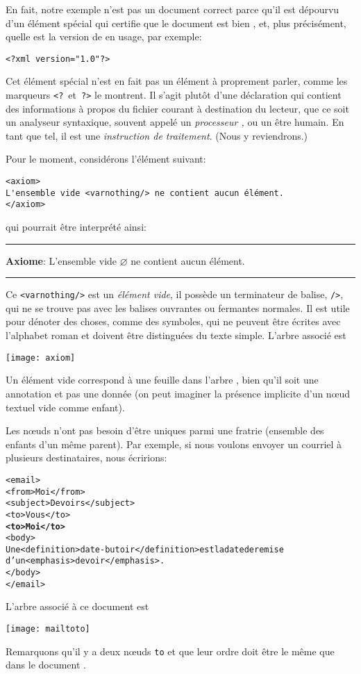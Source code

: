 En fait, notre exemple n'est pas un document \XML correct parce qu'il
est dépourvu d'un élément spécial qui certifie que le document est
bien \XML, et, plus précisément, quelle est la version de \XML en
usage, par exemple:
\begin{verbatim}
<?xml version="1.0"?>
\end{verbatim}
Cet élément spécial n'est en fait pas un élément à proprement parler,
comme les marqueurs \texttt{<?}~et~\texttt{?>} le montrent. Il s'agit
plutôt d'une déclaration qui contient des informations à propos du
fichier courant à destination du lecteur, que ce soit un analyseur
syntaxique, souvent appelé un \emph{processeur \XML,} ou un être
humain. En tant que tel, il est une \emph{instruction de traitement}.
(Nous y reviendrons.)

Pour le moment, considérons l'élément suivant:
\begin{verbatim}
<axiom>
L'ensemble vide <varnothing/> ne contient aucun élément.
</axiom>
\end{verbatim}
qui pourrait être interprété ainsi:\\
\noindent\rule{\linewidth}{0.5pt}
\textsf{
\textbf{Axiome}: L'ensemble vide \(\varnothing\) ne contient aucun élément.}\\
\noindent\rule{\linewidth}{0.5pt}

Ce \verb|<varnothing/>| est un \emph{élément vide}, il possède un
terminateur de balise, \verb|/>|, qui ne se trouve pas avec les
balises ouvrantes ou fermantes normales. Il est utile pour dénoter des
choses, comme des symboles, qui ne peuvent être écrites avec
l'alphabet roman et doivent être distinguées du texte simple. L'arbre
associé est
\begin{center}
\texttt{[image: axiom]}
\end{center}
Un élément vide correspond à une feuille dans l'arbre \XML, bien qu'il
soit une annotation et pas une donnée (on peut imaginer la présence
implicite d'un nœud textuel vide comme enfant).

Les nœuds n'ont pas besoin d'être uniques parmi une fratrie
(ensemble des enfants d'un même parent). Par exemple, si nous voulons
envoyer un courriel à plusieurs destinataires, nous écririons:
\begin{alltt}
\small<email>
  <from>Moi</from>
  <subject>Devoirs</subject>
  <to>Vous</to>
  \textbf{<to>Moi</to>}
  <body>
  Une <definition>date-butoir</definition> est la date de remise
d'un <emphasis>devoir</emphasis>.
  </body>
</email>
\end{alltt}
L'arbre \XML associé à ce document \XML est
\begin{center}
\texttt{[image: mailtoto]}
\end{center}
Remarquons qu'il y a deux nœuds \texttt{to} et que leur ordre doit
être le même que dans le document \XML.

